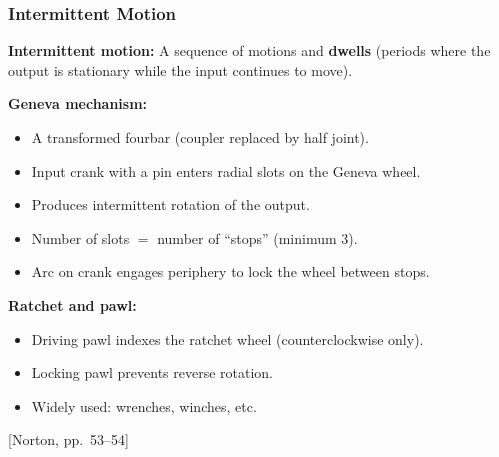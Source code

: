 \documentclass[10pt,aspectratio=43]{beamer}
\newcommand{\pref}[1]{\vfill\hfill{\scriptsize\color{gray}[Norton, pp.~#1]}}
\begin{document}
\begin{frame}
\frametitle{Intermittent Motion}

\begin{yellowbox}
\textbf{Intermittent motion:} A sequence of motions and \textbf{dwells} (periods where the output is stationary while the input continues to move).
\end{yellowbox}

\vspace{6pt}
\textbf{Geneva mechanism:}
\begin{itemize}
  \item A transformed fourbar (coupler replaced by half joint).
  \item Input crank with a pin enters radial slots on the Geneva wheel.
  \item Produces intermittent rotation of the output.
  \item Number of slots $=$ number of ``stops'' (minimum 3).
  \item Arc on crank engages periphery to lock the wheel between stops.
\end{itemize}

\vspace{4pt}
\textbf{Ratchet and pawl:}
\begin{itemize}
  \item Driving pawl indexes the ratchet wheel (counterclockwise only).
  \item Locking pawl prevents reverse rotation.
  \item Widely used: wrenches, winches, etc.
\end{itemize}
\pref{53--54}
\end{frame}

\end{document}
